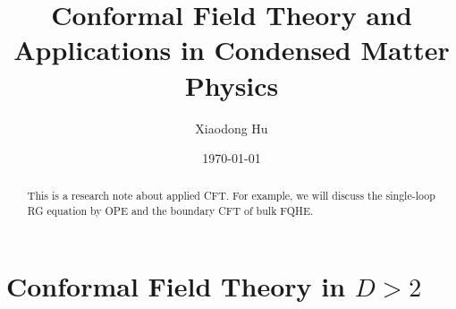 \documentclass[10pt,nofootinbib]{revtex4}
\begin{document}
\title{Conformal Field Theory and Applications in Condensed Matter Physics}%

\author{Xiaodong Hu}

\date{\today}

\begin{abstract}
	This is a research note about applied CFT. For example, we will discuss the single-loop RG equation by OPE and the boundary CFT of bulk FQHE.
\end{abstract}
\maketitle
\tableofcontents
\section{Conformal Field Theory in $D>2$}
\end{document}
